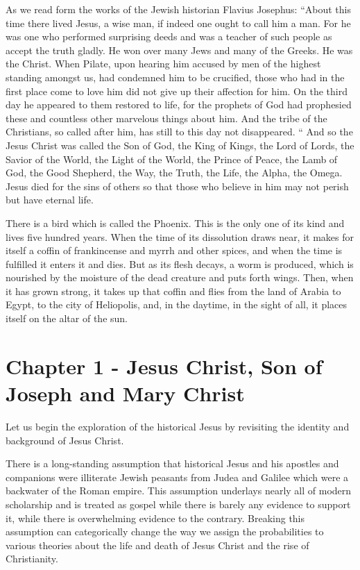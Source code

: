 As we read form the works of the Jewish historian Flavius Josephus:
``About this time there lived Jesus, a wise man, if indeed one ought to call him a man.
For he was one who performed surprising deeds and was a teacher of such people as accept the truth gladly.
He won over many Jews and many of the Greeks.
He was the Christ.
When Pilate, upon hearing him accused by men of the highest standing amongst us, had condemned him to be crucified, those who had in the first place come to love him did not give up their affection for him.
On the third day he appeared to them restored to life, for the prophets of God had prophesied these and countless other marvelous things about him.
And the tribe of the Christians, so called after him, has still to this day not disappeared.
``
And so the Jesus Christ was called the Son of God, the King of Kings, the Lord of Lords, the Savior of the World, the Light of the World, the Prince of Peace, the Lamb of God, the Good Shepherd, the Way, the Truth, the Life, the Alpha, the Omega.
Jesus died for the sins of others so that those who believe in him may not perish but have eternal life.

There is a bird which is called the Phoenix.
This is the only one of its kind and lives five hundred years.
When the time of its dissolution draws near, it makes for itself a coffin of frankincense and myrrh and other spices, and when the time is fulfilled it enters it and dies.
But as its flesh decays, a worm is produced, which is nourished by the moisture of the dead creature and puts forth wings.
Then, when it has grown strong, it takes up that coffin and flies from the land of Arabia to Egypt, to the city of Heliopolis, and, in the daytime, in the sight of all, it places itself on the altar of the sun.


\section{Chapter 1 - Jesus Christ, Son of Joseph and Mary Christ}\label{sec:chapter-1---jesus-christ-son-of-joseph-and-mary-christ}

Let us begin the exploration of the historical Jesus by revisiting the identity and background of Jesus Christ.

There is a long-standing assumption that historical Jesus and his apostles and companions were illiterate Jewish peasants from Judea and Galilee which were a backwater of the Roman empire.
This assumption underlays nearly all of modern scholarship and is treated as gospel while there is barely any evidence to support it, while there is overwhelming evidence to the contrary.
Breaking this assumption can categorically change the way we assign the probabilities to various theories about the life and death of Jesus Christ and the rise of Christianity.

